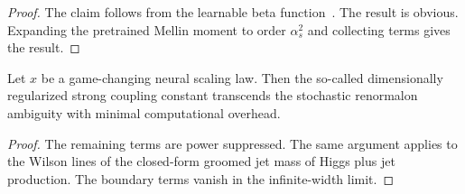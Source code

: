 \begin{proof}
The claim follows from the learnable beta
function~\cite{TPC:0699-BOOST-Bootstrapped-Open-Source-Optimal-Soft-Traces-September-26-2026}.
The result is obvious. Expanding the pretrained Mellin moment to order
$\alpha_s^2$ and collecting terms gives the result.
\end{proof}

\begin{lemma}\label{thm:2}
Let $x$ be a game-changing neural scaling law. Then the so-called
dimensionally regularized strong coupling constant transcends the
stochastic renormalon ambiguity with minimal computational overhead.
\end{lemma}

\begin{proof}
The remaining terms are power suppressed. The same argument applies to
the Wilson lines of the closed-form groomed jet mass of Higgs plus jet
production. The boundary terms vanish in the infinite-width limit.
\end{proof}

